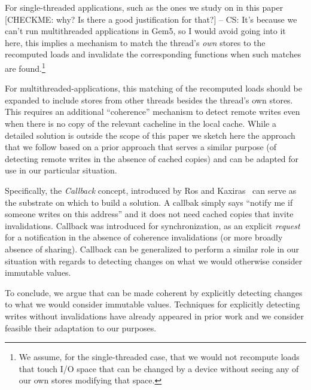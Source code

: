 For single-threaded applications, {\color{blue} such as the ones we study on in this paper} {\color{red} [CHECKME: why? Is there a good justification for that?] -- CS: It's because we can't run multithreaded applications in Gem5, so I would avoid going into it here}, this implies a mechanism to match the thread's \emph{own} stores to the recomputed loads and invalidate the corresponding {\recomp} functions when such matches are found.\footnote{We assume, for the single-threaded case, that we would not recompute loads that touch I/O space that can be changed by a device without seeing any of our own stores modifying that space.}

For multithreaded-applications, this matching of the recomputed loads should be expanded to include stores from other threads besides the thread's own stores. This requires an additional ``coherence'' mechanism to detect remote writes even when there is no copy of the relevant cacheline in the local cache. While a detailed solution is outside the scope of this paper we sketch here the approach that we follow based on a prior approach that serves a similar purpose (of detecting remote writes in the absence of cached copies) and can be adapted for use in our particular situation. 

Specifically, the \emph{Callback} concept, introduced by Ros and Kaxiras~\cite{aros-isca15} can serve as the substrate on which to build a solution. A callbak simply says ``notify me if someone writes on this address'' and it does not need cached copies that invite invalidations. Callback was introduced for synchronization, as an explicit \emph{request} for a notification in the absence of coherence invalidations (or more broadly absence of sharing). Callback can be generalized to perform a similar role in our situation with regards to detecting changes on what we would otherwise consider immutable values. 


To conclude, we argue that {\recomp} can be made coherent by explicitly detecting changes to what we would consider immutable values. Techniques for explicitly detecting writes without invalidations have already appeared in prior work and we consider feasible their adaptation to our purposes.

